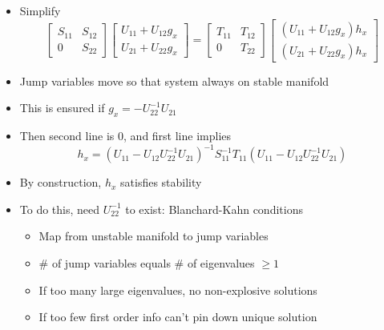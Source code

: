 \documentclass[bigger,handout]{beamer}
\begin{document}
\begin{frame}

\begin{itemize}
\item Simplify
\begin{equation*}
\begin{bmatrix}
  S_{11} & S_{12} \\
   0 & S_{22}
  \end{bmatrix}
  \begin{bmatrix}
  U_{11} + U_{12}g_x \\
   U_{21} + U_{22}g_x
  \end{bmatrix}
=
    \begin{bmatrix}
  T_{11} & T_{12} \\
   0 & T_{22}
  \end{bmatrix}
  \begin{bmatrix}
  (U_{11}+ U_{12}g_x)h_x \\
   (U_{21} + U_{22}g_x)h_x
  \end{bmatrix}
\end{equation*}
\item Jump variables move so that system always on stable manifold
\item This is ensured if $g_x=-U_{22}^{-1}U_{21}$
\item Then second line is 0, and first line implies
\begin{equation*}
h_x=(U_{11} - U_{12}U_{22}^{-1}U_{21})^{-1}S_{11}^{-1}T_{11}(U_{11} - U_{12}U_{22}^{-1}U_{21})
\end{equation*}
\item By construction, $h_x$ satisfies stability
\item To do this, need $U_{22}^{-1}$ to exist: Blanchard-Kahn conditions 
\begin{itemize}
\item Map from unstable manifold to jump variables
\item $\#$ of jump variables equals $\#$ of eigenvalues $\geq 1$
\item If too many large eigenvalues, no non-explosive solutions
\item If too few first order info can't pin down unique solution
\end{itemize}


\end{itemize}

\end{frame}%
\end{document}
